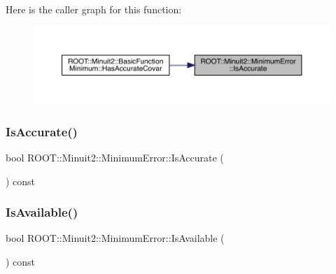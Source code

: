 Here is the caller graph for this function\+:
\nopagebreak
\begin{figure}[H]
\begin{center}
\leavevmode
\includegraphics[width=350pt]{d5/d32/classROOT_1_1Minuit2_1_1MinimumError_a70c9ff6b59f2c01e5e54b4010326753d_icgraph}
\end{center}
\end{figure}
\mbox{\label{classROOT_1_1Minuit2_1_1MinimumError_a70c9ff6b59f2c01e5e54b4010326753d}} 
\subsubsection{\texorpdfstring{IsAccurate()}{IsAccurate()}\hspace{0.1cm}{\footnotesize\ttfamily [3/3]}}
{\footnotesize\ttfamily bool R\+O\+O\+T\+::\+Minuit2\+::\+Minimum\+Error\+::\+Is\+Accurate (\begin{DoxyParamCaption}{ }\end{DoxyParamCaption}) const\hspace{0.3cm}{\ttfamily [inline]}}

\mbox{\label{classROOT_1_1Minuit2_1_1MinimumError_af03638c23ec7b5573c139810cdb640c0}} 
\subsubsection{\texorpdfstring{IsAvailable()}{IsAvailable()}\hspace{0.1cm}{\footnotesize\ttfamily [1/3]}}
{\footnotesize\ttfamily bool R\+O\+O\+T\+::\+Minuit2\+::\+Minimum\+Error\+::\+Is\+Available (\begin{DoxyParamCaption}{ }\end{DoxyParamCaption}) const\hspace{0.3cm}{\ttfamily [inline]}}

